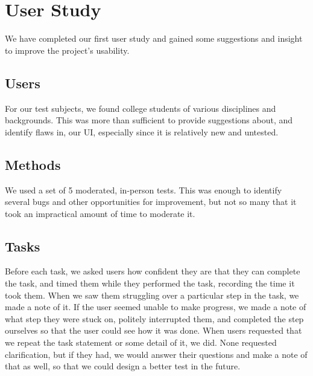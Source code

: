 \documentclass[letterpaper,10pt, onecolumn, draftclsnofoot]{IEEEtran}
\begin{document}
\section{User Study}

We have completed our first user study and gained some suggestions and insight to improve the project's usability. 

\subsection{Users}

For our test subjects, we found college students of various disciplines and backgrounds. This was more than sufficient to provide suggestions about, and identify flaws in, our UI, especially since it is relatively new and untested.

\subsection{Methods}

We used a set of 5 moderated, in-person tests. This was enough to identify several bugs and other opportunities for improvement, but not so many that it took an impractical amount of time to moderate it.

\subsection{Tasks}

Before each task, we asked users how confident they are that they can complete the task, and timed them while they performed the task, recording the time it took them. When we saw them struggling over a particular step in the task, we made a note of it. If the user seemed unable to make progress, we made a note of what step they were stuck on, politely interrupted them, and completed the step ourselves so that the user could see how it was done. When users requested that we repeat the task statement or some detail of it, we did. None requested clarification, but if they had, we would answer their questions and make a note of that as well, so that we could design a better test in the future.
\end{document}

